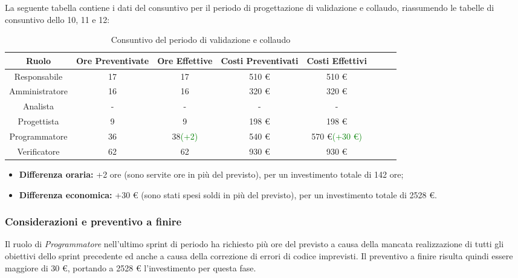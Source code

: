 La seguente tabella contiene i dati del consuntivo per il periodo di progettazione di validazione e collaudo, riassumendo le tabelle di consuntivo dello  10, 11 e 12:
\begin{table}[H]
		\begin{center}
			\setlength{\aboverulesep}{0pt}
			\setlength{\belowrulesep}{0pt}
			\setlength{\extrarowheight}{.75ex}
			\begin{tabular}{ c c c c c c c c }
				\rowcolor{AzzurroGruppo!30} 
				\textbf{Ruolo} & \textbf{Ore Preventivate} & \textbf{Ore Effettive} & \textbf{Costi Preventivati} & \textbf{Costi Effettivi}\\
				\toprule
				Responsabile   & 17 & 17 & 510 \euro{}  & 510 \euro{}\\
				Amministratore & 16 & 16 & 320 \euro{}  & 320 \euro{} \\
				Analista       & - & - & - & - \\
				Progettista    & 9 & 9 & 198 \euro{} & 198 \euro{} \\
				Programmatore  & 36 & 38\textcolor{green} {(+2)} & 540 \euro{}  & 570 \euro{}\textcolor{green}{(+30 \euro{})} \\
				Verificatore   & 62 & 62 & 930 \euro{}  & 930 \euro{} \\
				\bottomrule
			\end{tabular}
			\caption{Consuntivo del periodo di validazione e collaudo}
		\end{center}
	\end{table}
	
\begin{itemize}
	\item \textbf{Differenza oraria:} +2 ore (sono servite ore in più del previsto), per un investimento totale di 142 ore;
	\item \textbf{Differenza economica:} +30 \euro{} (sono stati spesi soldi in più del previsto), per un investimento totale di 2528 \euro{}.
\end{itemize}

\subsubsection{Considerazioni e preventivo a finire}
Il ruolo di \textit{Programmatore} nell'ultimo sprint di periodo ha richiesto più ore del previsto a causa della mancata realizzazione di tutti gli obiettivi dello sprint precedente ed anche a causa della correzione di errori di codice imprevisti. \newline{}
Il preventivo a finire risulta quindi essere maggiore di 30 \euro{}, portando a 2528 \euro{} l'investimento per questa fase.

